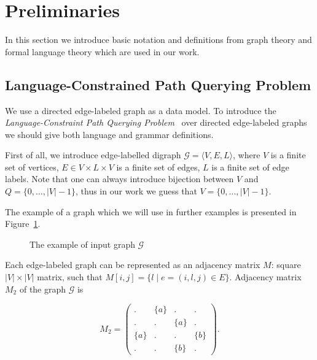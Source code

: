 \section{Preliminaries}

In this section we introduce basic notation and definitions from graph theory and formal language theory which are used in our work.

\subsection{Language-Constrained Path Querying Problem}

We use a directed edge-labeled graph as a data model. 
To introduce the \textit{Language-Constraint Path Querying Problem}~\cite{!!!} over directed edge-labeled graphs we should give both language and grammar definitions.

First of all, we introduce edge-labelled digraph $\mathcal{G} = \langle V,E,L \rangle$, where $V$ is a finite set of vertices, $E \in V \times L \times V$ is a finite set of edges, $L$ is a finite set of edge labels. 
Note that one can always introduce bijection between $V$ and $Q = \{0, \ldots, |V|-1\}$, thus in our work we guess that $V = \{0, \ldots, |V|-1\}$.

The example of a graph which we will use in further examples is presented in Figure~\ref{fig:example_input_graph}.

\begin{figure}[h]
    \centering        
    \caption{The example of input graph $\mathcal{G}$}
    \label{fig:example_input_graph}
\end{figure}

Each edge-labeled graph can be represented as an adjacency matrix $M$: square $|V|\times|V|$ matrix, such that $M[i,j] = \{l \mid e = (i,l,j) \in E\}$.
Adjacency matrix $M_2$ of the graph $\mathcal{G}$ is 

$$
    M_2 =
    \begin{pmatrix}
    . & \{a\} & . & .     \\
    . & . & \{a\} & .     \\
    \{a\} & . & . & \{b\} \\
    . & . & \{b\} & .
    \end{pmatrix}.
$$

